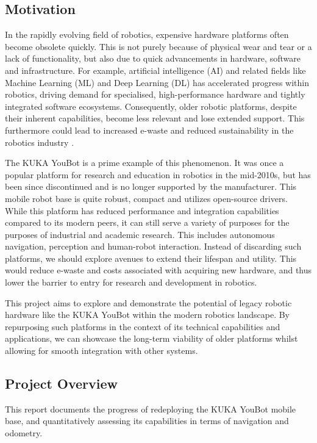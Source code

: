 \documentclass[a4paper, 12pt]{article}
\begin{document}
    \subsection{Motivation}


    In the rapidly evolving field of robotics, expensive hardware platforms often become obsolete quickly. This is not purely because of physical wear and tear or a lack of functionality, but also due to quick advancements in hardware, software and infrastructure. For example, artificial intelligence (AI) and related fields like Machine Learning (ML) and Deep Learning (DL) has accelerated progress within robotics, driving demand for specialised, high-performance hardware and tightly integrated software ecosystems. Consequently, older robotic platforms, despite their inherent capabilities, become less relevant and lose extended support. This furthermore could lead to increased e-waste and reduced sustainability in the robotics industry \cite{mcgloin2023introducing}. 

    The KUKA YouBot is a prime example of this phenomenon. It was once a popular platform for research and education in robotics in the mid-2010s, but has been since discontinued and is no longer supported by the manufacturer. This mobile robot base is quite robust, compact and utilizes open-source drivers. While this platform has reduced performance and integration capabilities compared to its modern peers, it can still serve a variety of purposes for the purposes of industrial and academic research. This includes autonomous navigation, perception and human-robot interaction. Instead of discarding such platforms, we should explore avenues to extend their lifespan and utility. This would reduce e-waste and costs associated with acquiring new hardware, and thus lower the barrier to entry for research and development in robotics.
    
    This project aims to explore and demonstrate the potential of legacy robotic hardware like the KUKA YouBot within the modern robotics landscape. By repurposing such platforms in the context of its technical capabilities and applications, we can showcase the long-term viability of older platforms whilst allowing for smooth integration with other systems. 

    \subsection{Project Overview}

    This report documents the progress of redeploying the KUKA YouBot mobile base, and quantitatively assessing its capabilities in terms of navigation and odometry. 
\end{document}
